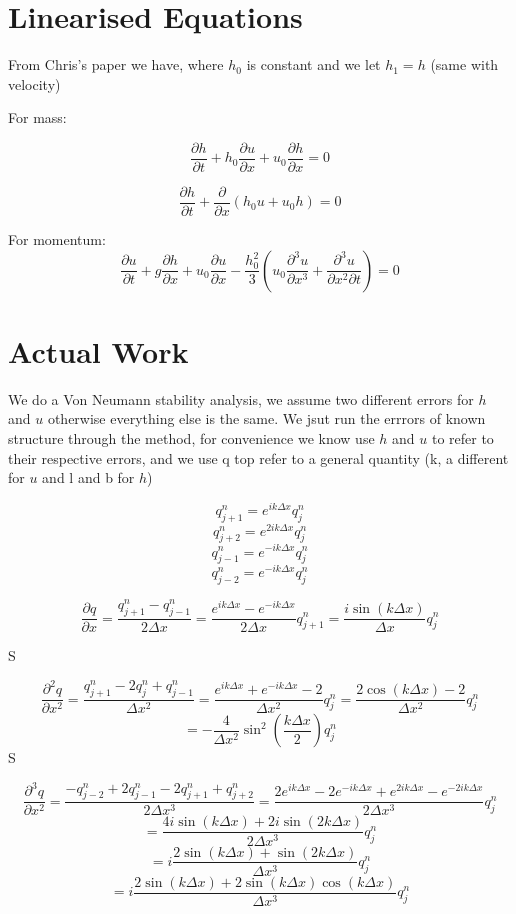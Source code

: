 \documentclass[12pt]{article}
\begin{document}
\section{Linearised Equations}
From Chris's paper we have, where $h_0$ is constant and we let $h_1 = h$ (same with velocity)

For mass:

\[\frac{\partial h}{\partial t} + h_0 \frac{\partial u}{\partial x} + u_0 \frac{\partial h}{\partial x} = 0\]

\[\frac{\partial h}{\partial t} + \frac{\partial}{\partial x} \left(h_0 u + u_0 h\right)= 0\]

For momentum:
\[ \frac{\partial u}{\partial t} + g\frac{\partial h}{\partial x}  + u_0\frac{\partial u}{\partial x} - \frac{h_0^2}{3}\left(u_0 \frac{\partial^3 u}{\partial x^3} + \frac{\partial^3 u}{\partial x^2 \partial t} \right)  = 0\]

\section{Actual Work}
We do a Von Neumann stability analysis, we assume two different errors for $h$ and $u$ otherwise everything else is the same. We jsut run the errrors of known structure through the method, for convenience we know use $h$ and $u$ to refer to their respective errors, and we use q top refer to a general quantity (k, a different for $u$ and l and b for $h$)

$$q^{n}_{j+1} = e^{ik\Delta x}q^n_j $$
$$q^{n}_{j+2} = e^{2ik\Delta x}q^n_j $$
$$q^{n}_{j-1} = e^{-ik\Delta x}q^n_j $$
$$q^{n}_{j-2} = e^{-ik\Delta x}q^n_j $$


\[\frac{\partial q}{\partial x} = \frac{q^{n}_{j+1} - q^{n}_{j-1}}{2\Delta x} =\frac{e^{ik\Delta x} - e^{-ik\Delta x}}{2\Delta x} q^{n}_{j+1} = \frac{i \sin\left(k \Delta x\right)}{\Delta x}q^{n}_{j} \]

S

\[\frac{\partial^2 q}{\partial x^2} = \frac{q^{n}_{j+1} -2q^{n}_{j} +q^{n}_{j-1}}{\Delta x^2} =\frac{e^{ik\Delta x} + e^{-ik\Delta x} - 2}{\Delta x^2} q^{n}_{j} = \frac{2 \cos\left(k\Delta x\right) - 2}{\Delta x^2} q^{n}_{j} \]
\[= -\frac{4}{\Delta x^2}\sin^2\left(\frac{k\Delta x}{2}\right) q^{n}_{j} \]
S

\[\frac{\partial^3 q}{\partial x^2} = \frac{-q^{n}_{j-2} +2q^{n}_{j-1} -2q^{n}_{j+1} +q^{n}_{j+2}}{2\Delta x^3} =\frac{2e^{ik\Delta x} - 2e^{-ik\Delta x} + e^{2ik\Delta x} - e^{-2ik\Delta x} }{2\Delta x^3} q^{n}_{j}  \]
\[=\frac{4i \sin\left(k\Delta x\right) + 2i\sin\left(2k\Delta x\right)}{2\Delta x^3} q^{n}_{j}\]
\[=i\frac{2 \sin\left(k\Delta x\right) + \sin\left(2k\Delta x\right)}{\Delta x^3} q^{n}_{j}\]
\[=i\frac{2 \sin\left(k\Delta x\right) + 2\sin\left(k\Delta x\right)\cos\left(k\Delta x\right)}{\Delta x^3} q^{n}_{j}\]
\end{document}
